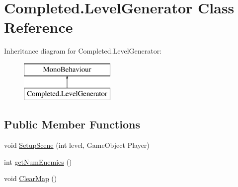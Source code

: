 \hypertarget{class_completed_1_1_level_generator}{}\section{Completed.\+Level\+Generator Class Reference}
\label{class_completed_1_1_level_generator}
Inheritance diagram for Completed.\+Level\+Generator\+:\begin{figure}[H]
\begin{center}
\leavevmode
\includegraphics[height=2.000000cm]{class_completed_1_1_level_generator}
\end{center}
\end{figure}
\subsection*{Public Member Functions}
\begin{DoxyCompactItemize}
\item 
void \mbox{\hyperlink{class_completed_1_1_level_generator_a1c8e4f88ea8b0667f9270e5ec4224d01}{Setup\+Scene}} (int level, Game\+Object Player)
\item 
int \mbox{\hyperlink{class_completed_1_1_level_generator_a2ffea5be00328c47fa5460db2386b8e5}{get\+Num\+Enemies}} ()
\item 
void \mbox{\hyperlink{class_completed_1_1_level_generator_a2b17e9d80d8ad66ee1c45234eb3fd47c}{Clear\+Map}} ()
\end{DoxyCompactItemize}
